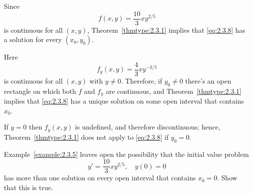 \begin{examplesolution}
 Since
\[
  f(x,y)=\frac{10}{3}xy^{2/5}
\]
is continuous for all $(x,y)$, Theorem~\ref{thmtype:2.3.1} implies that \eqref{eq:2.3.8} has a
solution for every $(x_{0},y_{0})$.

 Here
\[
  f_{y}(x,y)=\frac{4}{3}xy^{-3/5}
\]
is continuous for all $(x,y)$ with $y\ne0$. Therefore, if $y_{0}\ne0$ there's an open rectangle on
which both $f$ and $f_{y}$ are continuous, and Theorem~\ref{thmtype:2.3.1} implies that
\eqref{eq:2.3.8} has a unique solution on some open interval that contains $x_{0}$.

If $y=0$ then $f_{y}(x,y)$ is undefined, and therefore discontinuous; hence,
Theorem~\ref{thmtype:2.3.1} does not apply to \eqref{eq:2.3.8} if $y_{0}=0$.
\end{examplesolution}

\begin{example}
  \label{example:2.3.6} \rm Example~\ref{example:2.3.5} leaves open the possibility that the initial
  value problem
  \begin{equation}
    \label{eq:2.3.9}y'=\frac{10}{3}xy^{2/5},\quad y(0)=0
  \end{equation}
  has more than one solution on every open interval that contains $x_{0}=0$. Show that this is true.
\end{example}

